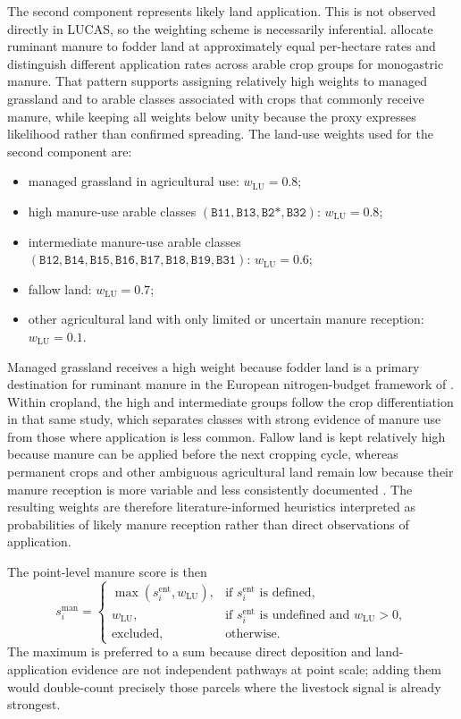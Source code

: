 The second component represents likely land application. This is not
observed directly in LUCAS, so the weighting scheme is necessarily
inferential. \citet{Velthof2009} allocate ruminant manure to fodder
land at approximately equal per-hectare rates and distinguish different
application rates across arable crop groups for monogastric manure.
That pattern supports assigning relatively high weights to managed
grassland and to arable classes associated with crops that commonly
receive manure, while keeping all weights below unity because the proxy
expresses likelihood rather than confirmed spreading. The land-use
weights used for the second component are:
\begin{itemize}
  \setlength{\itemsep}{0.25em}
  \setlength{\parskip}{0pt}
  \item managed grassland in agricultural use: $w_{\mathrm{LU}}=0.8$;
  \item high manure-use arable classes
        $(\texttt{B11}, \texttt{B13}, \texttt{B2*}, \texttt{B32})$:
        $w_{\mathrm{LU}}=0.8$;
  \item intermediate manure-use arable classes
        $(\texttt{B12}, \texttt{B14}, \texttt{B15}, \texttt{B16},
        \texttt{B17}, \texttt{B18}, \texttt{B19}, \texttt{B31})$:
        $w_{\mathrm{LU}}=0.6$;
  \item fallow land: $w_{\mathrm{LU}}=0.7$;
  \item other agricultural land with only limited or uncertain manure
        reception: $w_{\mathrm{LU}}=0.1$.
\end{itemize}
Managed grassland receives a high weight because fodder land is a
primary destination for ruminant manure in the European nitrogen-budget
framework of \citet{Velthof2009}. Within cropland, the high and
intermediate groups follow the crop differentiation in that same study,
which separates classes with strong evidence of manure use from those
where application is less common. Fallow land is kept relatively high
because manure can be applied before the next cropping cycle, whereas
permanent crops and other ambiguous agricultural land remain low because
their manure reception is more variable and less consistently documented
\citep{oenema_2017}. The resulting weights are therefore
literature-informed heuristics interpreted as probabilities of likely
manure reception rather than direct observations of application.

The point-level manure score is then
\begin{equation}
  s_i^{\mathrm{man}} =
  \begin{cases}
    \max\!\left(s_i^{\mathrm{ent}}, w_{\mathrm{LU}}\right),
      & \text{if } s_i^{\mathrm{ent}} \text{ is defined},\\[4pt]
    w_{\mathrm{LU}},
      & \text{if } s_i^{\mathrm{ent}} \text{ is undefined and }
        w_{\mathrm{LU}} > 0,\\[4pt]
    \text{excluded}, & \text{otherwise}.
  \end{cases}
\end{equation}
The maximum is preferred to a sum because direct deposition and
land-application evidence are not independent pathways at point scale;
adding them would double-count precisely those parcels where the
livestock signal is already strongest.

